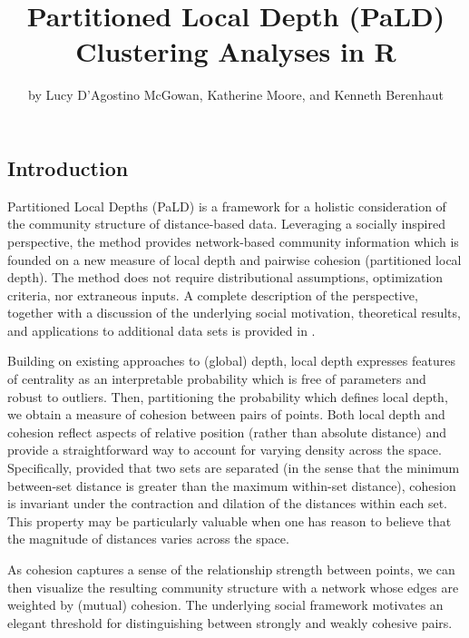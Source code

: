 \title{Partitioned Local Depth (PaLD) Clustering Analyses in R}
\author{by Lucy D'Agostino McGowan, Katherine Moore, and Kenneth Berenhaut}

\maketitle


\hypertarget{introduction}{%
\subsection{Introduction}\label{introduction}}

Partitioned Local Depths (PaLD) is a framework for a holistic
consideration of the community structure of distance-based data.
Leveraging a socially inspired perspective, the method provides
network-based community information which is founded on a new measure of
local depth and pairwise cohesion (partitioned local depth). The method
does not require distributional assumptions, optimization criteria, nor
extraneous inputs. A complete description of the perspective, together
with a discussion of the underlying social motivation, theoretical
results, and applications to additional data sets is provided in
\citet{berenhaut2022social}.

Building on existing approaches to (global) depth, local depth expresses
features of centrality as an interpretable probability which is free of
parameters and robust to outliers. Then, partitioning the probability
which defines local depth, we obtain a measure of cohesion between pairs
of points. Both local depth and cohesion reflect aspects of relative
position (rather than absolute distance) and provide a straightforward
way to account for varying density across the space. Specifically,
provided that two sets are separated (in the sense that the minimum
between-set distance is greater than the maximum within-set distance),
cohesion is invariant under the contraction and dilation of the
distances within each set. This property may be particularly valuable
when one has reason to believe that the magnitude of distances varies
across the space.

As cohesion captures a sense of the relationship strength between
points, we can then visualize the resulting community structure with a
network whose edges are weighted by (mutual) cohesion. The underlying
social framework motivates an elegant threshold for distinguishing
between strongly and weakly cohesive pairs.


